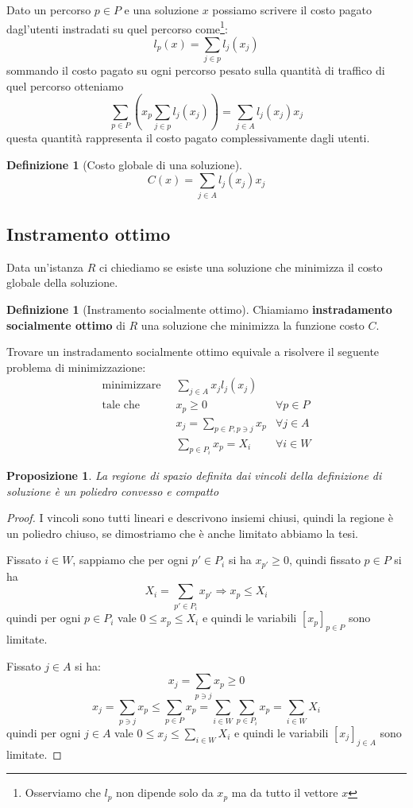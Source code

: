 \documentclass[a4paper]{article}
\theoremstyle{plain}
\newtheorem{mypro}[myteo]{Proposizione}
\theoremstyle{definition}
\newtheorem{mydef}[myteo]{Definizione}
\theoremstyle{remark}
\newcommand{\pa}[1]{\left(#1\right)}
\newcommand{\bra}[1]{\left[#1\right]}
\begin{document}
Dato un percorso $p\in P$ e una soluzione $x$ possiamo scrivere il
costo pagato dagl'utenti instradati su quel percorso
come\footnote{Osserviamo che $l_p$ non dipende solo da $x_p$ ma da
  tutto il vettore $x$}:
\[ l_p\pa{x} = \sum _{j\in p} l_j\pa{x_j} \]
sommando il costo pagato su ogni percorso pesato sulla quantit\`a di
traffico di quel percorso otteniamo
\[ \sum _{p\in P} \pa{ x_p \sum _{j\in p} l_j\pa{x_j}}  = \sum _{j\in
    A} l_j\pa{x_j}x_j \]
questa quantit\`a rappresenta il costo pagato complessivamente dagli utenti.

\begin{mydef}[Costo globale di una soluzione]
\label{def:costo-globale}
  \[ C\pa{x} = \sum _{j\in A} l_j\pa{x_j}x_j \]  
\end{mydef}

\subsection{Instramento ottimo}
\label{sec:instramento-ottimo}

Data un'istanza $R$ ci chiediamo se esiste una soluzione che minimizza
il costo globale della soluzione.

\begin{mydef}[Instramento socialmente ottimo]
\label{def:soluzione-so}
  Chiamiamo \textbf{instradamento socialmente ottimo} di $R$ una
  soluzione che minimizza la funzione costo $C$. 
\end{mydef}

Trovare un instradamento socialmente ottimo equivale a risolvere il
seguente problema di minimizzazione:
\begin{align*}
      \text{minimizzare}\;\; & \sum _{j\in A} x_j l_j(x_j) \\
      \text{tale che}\;\; &   x_p \ge 0 & \forall p\in P \\
      & x_j = \sum_{p\in P,p\ni j} x_p & \forall j\in A \\
      &\sum_{p\in P_i} x_p = X_i & \forall i\in W
\end{align*}

\begin{mypro}
  La regione di spazio definita dai vincoli della definizione di
  soluzione \`e un poliedro convesso e compatto
\end{mypro}
\begin{proof}
  I vincoli sono tutti lineari e descrivono insiemi chiusi, quindi la
  regione \`e un poliedro chiuso, se dimostriamo che \`e anche
  limitato abbiamo la tesi.

  Fissato $i\in W$, sappiamo che per ogni $p'\in P_i$ si ha $x_{p'} \ge
  0$, quindi fissato $p\in P$ si ha
  \[ X_i = \sum _{p'\in P_i} x_{p'} \Rightarrow x_p \le X_i \]
  quindi per ogni $p\in P_i$ vale $0\le x_p \le X_i$ e quindi le
  variabili $\bra{x_p}_{p\in P}$ sono limitate.

  Fissato $j\in A$ si ha:
  \[ x_j = \sum _{p\ni j} x_p \ge 0 \]
  \[ x_j = \sum _{p\ni j} x_p \le \sum _{p\in P} x_p = \sum _{i\in W}
    \sum _{p\in P_i} x_p = \sum _{i\in W} X_i \]
  quindi per ogni $j\in A$ vale $0\le x_j \le \sum _{i\in W} X_i$ e
  quindi le variabili $\bra{x_j}_{j\in A}$ sono limitate.
\end{proof}
\end{document}

